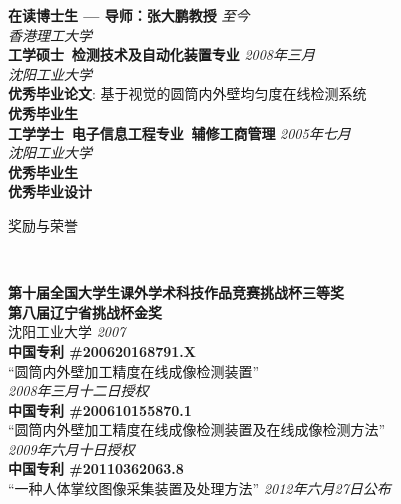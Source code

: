 \documentclass[9pt]{article}
\newenvironment{changemargin}[2]{%
  \begin{list}{}{%
    \setlength{\topsep}{0pt}%
    \setlength{\leftmargin}{#1}%
    \setlength{\rightmargin}{#2}%
    \setlength{\listparindent}{\parindent}%
    \setlength{\itemindent}{\parindent}%
    \setlength{\parsep}{\parskip}%
  }%
  \item[]}{\end{list}
}
\newcommand{\lineover}{
	\begin{changemargin}{-0.05in}{-0.05in}
		\vspace*{-8pt}
		\hrulefill \\
		\vspace*{-2pt}
	\end{changemargin}
}
\newcommand{\header}[1]{
	\begin{changemargin}{-0.5in}{-0.5in}
		\scshape{#1}\\
  	\lineover
	\end{changemargin}
}
\newenvironment{body} {
	\vspace*{-16pt}
	\begin{changemargin}{-0.25in}{-0.5in}
  }	
	{\end{changemargin}
}
\begin{document}
\begin{body}
	\vspace{14pt}
	\textbf{在读博士生 --- 导师：张大鹏教授}{} \hfill \emph{至今}{} \\
	\emph{香港理工大学}\\
  \medskip
	\textbf{工学硕士\, 检测技术及自动化装置专业}{} \hfill \emph{2008年三月}{} \\
	\emph{沈阳工业大学}\\
	\textbf{优秀毕业论文}: 基于视觉的圆筒内外壁均匀度在线检测系统\\
    \textbf{优秀毕业生}\\
  \medskip
	\textbf{工学学士\, 电子信息工程专业\, 辅修工商管理} \hfill \emph{2005年七月} \\
    \emph{沈阳工业大学}\\
    \textbf{优秀毕业生}\\
    \textbf{优秀毕业设计}\\
\end{body}

\medskip


\header{奖励与荣誉}

\begin{body}
	\vspace{14pt}	
    \textbf{第十届全国大学生课外学术科技作品竞赛挑战杯三等奖\\
    第八届辽宁省挑战杯金奖}\\
    沈阳工业大学 \hfill{} \emph{2007}\\
    \medskip
    \textbf{中国专利 \#200620168791.X}\\
    ``圆筒内外壁加工精度在线成像检测装置''\\
    \hfill{} \emph{2008年三月十二日授权}\\
    \medskip	
    \textbf{中国专利 \#200610155870.1}\\
    ``圆筒内外壁加工精度在线成像检测装置及在线成像检测方法''\\
    \hfill{} \emph{2009年六月十日授权}\\
    \medskip    
    \textbf{中国专利 \#20110362063.8}\\
    ``一种人体掌纹图像采集装置及处理方法'' \hfill{} \emph{2012年六月27日公布}
\end{body}
\end{document}
